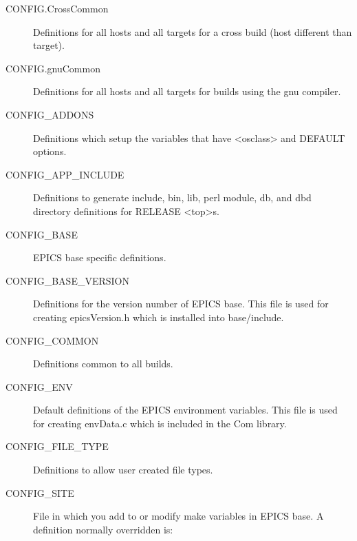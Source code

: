 \begin{description}

\item[CONFIG.CrossCommon] 

Definitions for all hosts and all targets for a cross build (host different than target).

\item[CONFIG.gnuCommon] 

Definitions for all hosts and all targets for builds using the gnu compiler.

\item[CONFIG\_ADDONS] 

Definitions which setup the variables that have \textless{}osclass\textgreater{} and DEFAULT options.

\item[CONFIG\_APP\_INCLUDE]

Definitions to generate include, bin, lib, perl module, db, and dbd directory definitions for RELEASE \textless{}top\textgreater{}s.

\item[CONFIG\_BASE] 

EPICS base specific definitions.

\item[CONFIG\_BASE\_VERSION] 

Definitions for the version number of EPICS base. This file is used for creating epicsVersion.h which is installed 
into base/include.

\item[CONFIG\_COMMON] 

Definitions common to all builds.

\item[CONFIG\_ENV] 

Default definitions of the EPICS environment variables. This file is used for creating envData.c which is included 
in the Com library.

\item[CONFIG\_FILE\_TYPE] 

Definitions to allow user created file types.

\item[CONFIG\_SITE] 

File in which you add to or modify make variables in EPICS base. A definition normally overridden is:


\end{description}
